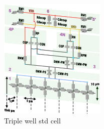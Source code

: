 
\begin{figure}[h]
	\label{fig_triplewellstdcell}
	\centering
	\includegraphics[width=0.45\textwidth]{./figures/tripleWell_no_7c_Eevee_LR.png}
	\caption{Triple well std cell}
\end{figure}
